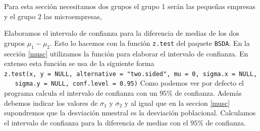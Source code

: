 \documentclass[
]{krantz}
\makeatletter
\newenvironment{Shaded}{\begin{snugshade}}{\end{snugshade}}
\newcommand{\DataTypeTok}[1]{\textcolor[rgb]{0.27,0.27,0.27}{#1}}
\newcommand{\KeywordTok}[1]{\textcolor[rgb]{0.27,0.27,0.27}{\textbf{#1}}}
\newcommand{\NormalTok}[1]{#1}
\newcommand{\OperatorTok}[1]{\textcolor[rgb]{0.43,0.43,0.43}{\textbf{#1}}}
\newcommand{\StringTok}[1]{\textcolor[rgb]{0.5,0.5,0.5}{#1}}
\newenvironment{kframe}{%
\medskip{}
\setlength{\fboxsep}{.8em}
 \def\at@end@of@kframe{}%
 \ifinner\ifhmode%
  \def\at@end@of@kframe{\end{minipage}}%
  \begin{minipage}{\columnwidth}%
 \fi\fi%
 \def\FrameCommand##1{\hskip\@totalleftmargin \hskip-\fboxsep
 \colorbox{shadecolor}{##1}\hskip-\fboxsep
     \hskip-\linewidth \hskip-\@totalleftmargin \hskip\columnwidth}%
 \MakeFramed {\advance\hsize-\width
   \@totalleftmargin\z@ \linewidth\hsize
   \@setminipage}}%
 {\par\unskip\endMakeFramed%
 \at@end@of@kframe}
\renewenvironment{Shaded}{\begin{kframe}}{\end{kframe}}
\makeatother
\begin{document}
Para esta sección necesitamos dos grupos el grupo 1 serán las pequeñas empresas y el grupo 2 las microempresas,

\begin{Shaded}
\end{Shaded}

Elaboramos el intervalo de confianza para la diferencia de medias de los dos grupos \(\mu_1-\mu_2\). Esto lo hacemos con la función \texttt{z.test} del paquete \texttt{BSDA}. En la sección \ref{musc} utilizamos la función para elaborar el intervalo de confianza. En extenso esta función se usa de la siguiente forma \texttt{z.test(x,\ y\ =\ NULL,\ alternative\ =\ "two.sided",\ mu\ =\ 0,\ sigma.x\ =\ NULL,\ \ \ sigma.y\ =\ NULL,\ conf.level\ =\ 0.95)} Como podemos ver por defecto el programa calcula el intervalo de confianza con un \(95\%\) de confianza. Además debemos indicar los valores de \(\sigma_1\) y \(\sigma_2\) y al igual que en la seccion \ref{musc} supondremos que la desviación muestral es la desviación poblacional. Calculamos el intervalo de confianza para la diferencia de medias con el \(95\)\% de confianza.

\begin{Shaded}
\end{Shaded}
\end{document}
